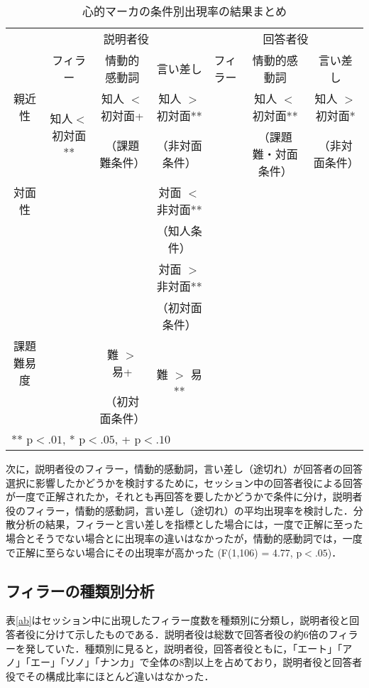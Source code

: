 \documentclass[japanese]{jnlp_1.3a}
\begin{document}
\begin{table}[t]
\caption{心的マーカの条件別出現率の結果まとめ} \label{marker_trend}
\scriptsize
\begin{tabular}{c c c c c c c} \hline
 & \multicolumn{3}{c}{説明者役} & \multicolumn{3}{c}{回答者役}\\
 & フィラー & 情動的感動詞 & 言い差し & フィラー & 情動的感動詞 & 言い差し\\ \hline
親近性 & \multirow{2}{19mm}{知人$<$初対面**} & 知人 $<$ 初対面+
 & 知人 $>$ 初対面** &  & 知人 $<$ 初対面** & 知人 $>$ 初対面*\\
 & &（課題難条件） & （非対面条件） & & （課題難・対面条件） & （非対面条件）\\
対面性 &  &  & 対面 $<$ 非対面** &  &  & \\
 & & & （知人条件） & & & \\
 &  &  & 対面 $>$ 非対面** &  &  & \\
 & & & （初対面条件） & & & \\
課題難易度 &  & 難 $>$ 易+ & \multirow{2}{12mm}{難 $>$ 易**} &  &  & \\
 & & （初対面条件） & & & &\\ \hline
\multicolumn{5}{l}{** $\mathrm{p} < .01$, * $\mathrm{p} < .05$, + $\mathrm{p} < .10$}
\end{tabular}
\end{table}


次に，説明者役のフィラー，情動的感動詞，言い差し（途切れ）が回答者の回答選択に影響したかどうかを検討するために，セッション中の回答者役による回答が一度で正解されたか，それとも再回答を要したかどうかで条件に分け，説明者役のフィラー，情動的感動詞，言い差し（途切れ）の平均出現率を検討した．分散分析の結果，フィラーと言い差しを指標とした場合には，一度で正解に至った場合とそうでない場合とに出現率の違いはなかったが，情動的感動詞では，一度で正解に至らない場合にその出現率が高かった (F(1,106) = 4.77, $\mathrm{p} < .05$)．

\subsection{フィラーの種類別分析}
表\ref{ab}はセッション中に出現したフィラー度数を種類別に分類し，説明者役と回答者役に分けて示したものである．説明者役は総数で回答者役の約6倍のフィラーを発していた．種類別に見ると，説明者役，回答者役ともに，「エート」「アノ」「エー」「ソノ」「ナンカ」で全体の8割以上を占めており，説明者役と回答者役でその構成比率にほとんど違いはなかった．
\end{document}

